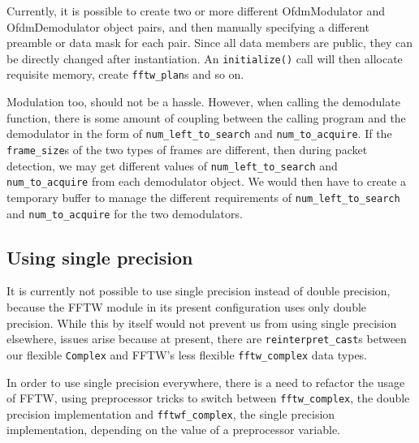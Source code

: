 Currently, it is possible to create two or more different OfdmModulator and
OfdmDemodulator object pairs, and then manually specifying a different preamble
or data mask for each pair. Since all data members are public, they can be
directly changed after instantiation. An \lstinline!initialize()! call will
then allocate requisite memory, create \lstinline!fftw_plan!s and so on.

Modulation too, should not be a hassle. However, when calling the demodulate
function, there is some amount of coupling between the calling program and the
demodulator in the form of \lstinline!num_left_to_search! and
\lstinline!num_to_acquire!. If the \lstinline!frame_size!s of the two types
of frames are different, then during packet detection, we may get different
values of \lstinline!num_left_to_search! and \lstinline!num_to_acquire!
from each demodulator object. We would then have to create a temporary buffer
to manage the different requirements of \lstinline!num_left_to_search! and
\lstinline!num_to_acquire! for the two demodulators.

\subsection{Using single precision}

It is currently not possible to use single precision instead of double
precision, because the FFTW module in its present configuration uses only
double precision. While this by itself would not prevent us from using single
precision elsewhere, issues arise because at present, there are
\lstinline!reinterpret_cast!s between our flexible \lstinline!Complex! and
FFTW's less flexible \lstinline!fftw_complex! data types.

In order to use single precision everywhere, there is a need to refactor the
usage of FFTW, using preprocessor tricks to switch between
\lstinline!fftw_complex!, the double precision implementation and
\lstinline!fftwf_complex!, the single precision implementation, depending on
the value of a preprocessor variable.
